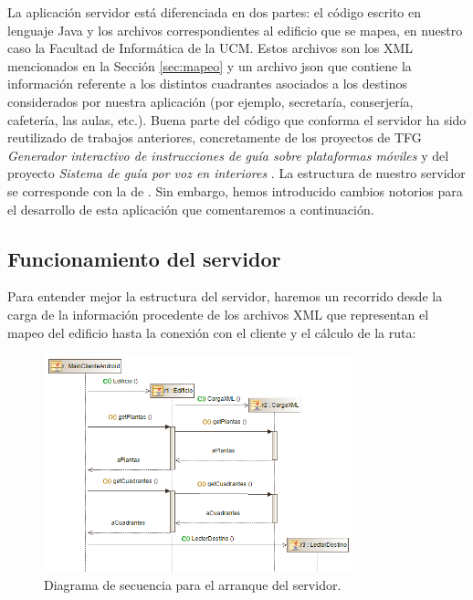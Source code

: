 La aplicación servidor está diferenciada en dos partes: el código escrito en lenguaje Java y los archivos correspondientes al edificio que se mapea, en nuestro caso la Facultad de Informática de la UCM. Estos archivos son los XML mencionados en la Sección \ref{sec:mapeo} y un archivo json que contiene la información referente a los distintos cuadrantes asociados a los destinos considerados por nuestra aplicación (por ejemplo, secretaría, conserjería, cafetería, las aulas,  etc.). 
Buena parte del código que conforma el servidor ha sido reutilizado de trabajos anteriores, concretamente de los proyectos de TFG \textit{Generador interactivo de instrucciones de guía sobre plataformas móviles} \citep{TFGguia} y del proyecto \textit{Sistema de guía por voz en interiores} \citep{TFGMariana}. La estructura de nuestro servidor se corresponde con la de \cite{TFGguia}. Sin embargo, hemos introducido cambios notorios para el desarrollo de esta aplicación que comentaremos a continuación.

\subsection{Funcionamiento del servidor}
\label{sub:func_servidor}

Para entender mejor la estructura del servidor, haremos un recorrido desde la carga de la información procedente de los archivos XML que representan el mapeo del edificio hasta la conexión con el cliente y el cálculo de la ruta: 


\begin{figure}[t]
	\centering
	\includegraphics[width=0.8\textwidth]{Imagenes/Capitulo4/diagramasUML/arranqueServidor}
	\caption{Diagrama de secuencia para el arranque del servidor.}
	\label{fig:diag_sec_arranqueServ}
\end{figure}




